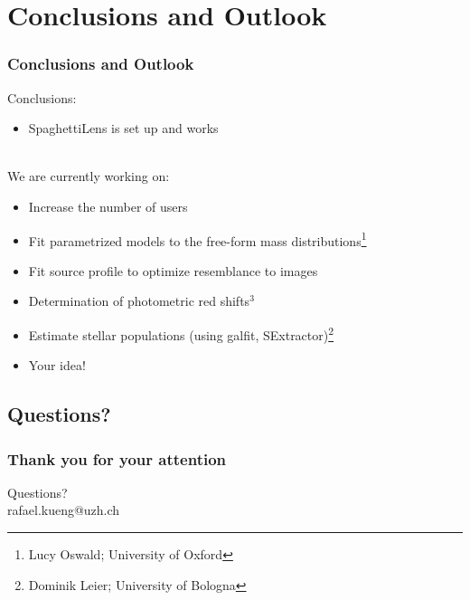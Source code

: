 \documentclass{beamer}
\begin{document}
%






\section{Conclusions and Outlook}

\begin{frame}
  \frametitle{Conclusions and Outlook}
	Conclusions:
  \begin{itemize}
		\item SpaghettiLens is set up and works
	\end{itemize}
	
	~\\
  
	We are currently working on:
  \begin{itemize}
		\item Increase the number of users
  	\item Fit parametrized models to the free-form mass distributions\footnote{Lucy Oswald; University of Oxford}
		\item Fit source profile to optimize resemblance to images
    \item Determination of photometric red shifts$^3$
    \item Estimate stellar populations (using galfit, SExtractor)\footnote{Dominik Leier; University of Bologna}
		\item Your idea!
  \end{itemize}
\end{frame}



\subsection*{Questions?}

\begin{frame}
  \frametitle{Thank you for your attention}
  Questions? \\
  rafael.kueng@uzh.ch
\end{frame}




%
\end{document}
